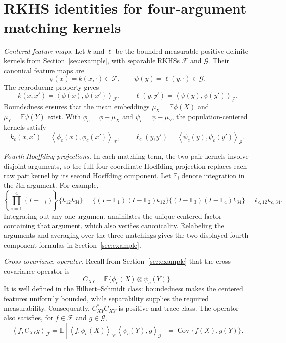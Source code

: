 \documentclass[11pt]{article}
\theoremstyle{plain}
\theoremstyle{definition}
\theoremstyle{remark}
\newcommand{\E}{\mathbb E}
\newcommand{\Cov}{\operatorname{Cov}}
\newcommand{\inner}[2]{\left\langle #1,#2\right\rangle}
\begin{document}
\section{\texorpdfstring{{RKHS identities for four-argument matching kernels}}{RKHS identities for four-argument matching kernels}}
\label{app:rkhs}
\noindent\emph{Centered feature maps.}
Let $k$ and $\ell$ be the bounded measurable positive-definite kernels from Section~\ref{sec:example}, with separable RKHSs $\mathcal F$ and
$\mathcal G$.  Their canonical feature maps are
\[
 \phi(x)=k(x,\cdot)\in\mathcal F,
 \qquad
 \psi(y)=\ell(y,\cdot)\in\mathcal G.
\]
The reproducing property gives
\[
 k(x,x')=\inner{\phi(x)}{\phi(x')}_{\mathcal F},
 \qquad
 \ell(y,y')=\inner{\psi(y)}{\psi(y')}_{\mathcal G}.
\]
Boundedness ensures that the mean embeddings
$\mu_X=\E\phi(X)$ and $\mu_Y=\E\psi(Y)$ exist.  With
$\phi_c=\phi-\mu_X$ and $\psi_c=\psi-\mu_Y$, the population-centered kernels
satisfy
\[
 k_c(x,x')=\inner{\phi_c(x)}{\phi_c(x')}_{\mathcal F},
 \qquad
 \ell_c(y,y')=\inner{\psi_c(y)}{\psi_c(y')}_{\mathcal G}.
\]

\medskip
\noindent\emph{Fourth Hoeffding projections.}
In each matching term, the two pair kernels involve disjoint arguments, so
the full four-coordinate Hoeffding projection replaces each raw pair kernel
by its second Hoeffding component.  Let $\mathbb E_i$ denote integration in
the $i$th argument.  For example,
\[
 \left\{\prod_{i=1}^4(I-\mathbb E_i)\right\}
       \{k_{12}k_{34}\}
 =\{(I-\mathbb E_1)(I-\mathbb E_2)k_{12}\}
  \{(I-\mathbb E_3)(I-\mathbb E_4)k_{34}\}
 =k_{c,12}k_{c,34}.
\]
Integrating out any one argument annihilates the unique centered factor
containing that argument, which also verifies canonicality.  Relabeling the
arguments and averaging over the three matchings gives the two displayed
fourth-component formulas in Section~\ref{sec:example}.

\medskip
\noindent\emph{Cross-covariance operator.}
Recall from Section~\ref{sec:example} that the cross-covariance operator is
\[
 C_{XY}=\E\{\phi_c(X)\otimes\psi_c(Y)\}.
\]
It is well defined in the Hilbert--Schmidt class: boundedness makes the centered
features uniformly bounded, while separability supplies the required
measurability.  Consequently, $C_{XY}^{\ast}C_{XY}$ is positive and
trace-class.  The operator also satisfies, for $f\in\mathcal F$ and
$g\in\mathcal G$,
\[
 \inner{f}{C_{XY}g}_{\mathcal F}
 =\E\!\left[
   \inner{f}{\phi_c(X)}_{\mathcal F}
   \inner{\psi_c(Y)}{g}_{\mathcal G}
 \right]
 =\Cov\{f(X),g(Y)\}.
\]
\end{document}
